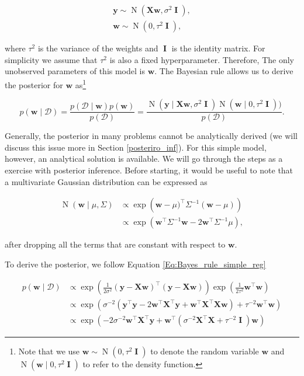 \documentclass[dissertation,math,vertlayout,pdfa,colorlinks]{aaltoseries}
\newcommand{\bw}{\bm{w}}
\newcommand{\bX}{\bm{X}}
\newcommand{\by}{\bm{y}}
\newcommand{\bD}{\mathcal{D}}
\DeclareMathOperator{\eye}{\textbf{I}}
\DeclareMathOperator{\normalpdf}{N}
\newcommand{\tp}{^{\top}}
\begin{document}
\begin{align}\label{Eq:simple_Bayesian_regression} 
\by \sim \normalpdf(\bX\bw,\sigma^2 \eye),\\
\bw \sim \normalpdf(0,\tau^2 \eye), \nonumber
\end{align}

\noindent where $\tau^2$ is the variance of the weights and $\eye$ is the identity matrix. For simplicity we assume that $\tau^2$ is also a fixed hyperparameter. Therefore, The only unobserved parameters of this model is $\bw$. The Bayesian rule allows us to derive the posterior for $\bw$ as\footnote{Note that we use $\bw \sim \normalpdf(0,\tau^2 \eye)$ to denote the random variable $\bw$ and $\normalpdf(\bw\mid 0,\tau^2 \eye)$ to refer to the density function.}

\begin{equation}\label{Eq:Bayes_rule_simple_reg}
p(\bw \mid \bD) = \frac{p(\bD \mid \bw)p(\bw)}{p(\bD)} = \frac{\normalpdf(\by \mid \bX \bw,\sigma^2 \eye) \normalpdf(\bw \mid 0,\tau^2 \eye))}{p(\bD)}.
\end{equation}  

Generally, the posterior in many problems cannot be analytically derived (we will discuss this issue more in Section \ref{posteriro_inf}). For this simple model, however, an analytical solution is available. We will go through the steps as a exercise with posterior inference. Before starting, it would be useful to note that a multivariate Gaussian distribution can be expressed as  

\begin{align}\label{Eq:multi_Gauss}
\normalpdf(\bw \mid \mu,\Sigma) &\propto \exp \left (\bw - \mu)\tp\Sigma^{-1}(\bw - \mu) \right) \nonumber\\
&\propto \exp \left ( \bw\tp\Sigma^{-1}\bw -  2\bw\tp\Sigma^{-1}\mu \right),
\end{align}

\noindent after dropping all the terms that are constant with respect to $\bw$. 

To derive the posterior, we follow Equation \ref{Eq:Bayes_rule_simple_reg} 

\begin{align} \label{Eq:lin_rel_simple_derivation}
p(\bw \mid \bD) &\propto \exp \left(\frac{1}{2\sigma^2} (\by - \bX \bw)\tp(\by - \bX \bw)\right) \exp(\frac{1}{2\tau^2}\bw\tp\bw) \nonumber\\ 
&\propto \exp \left (\sigma^{-2}(\by\tp\by - 2\bw\tp\bX\tp\by + \bw\tp\bX\tp\bX\bw)+ \tau^{-2}\bw\tp\bw \right) \nonumber\\
&\propto \exp \left ( -2\sigma^{-2}\bw\tp\bX\tp\by + \bw\tp( \sigma^{-2}\bX\tp\bX + \tau^{-2} \eye )\bw \right) %
\end{align}    
 
\end{document}
